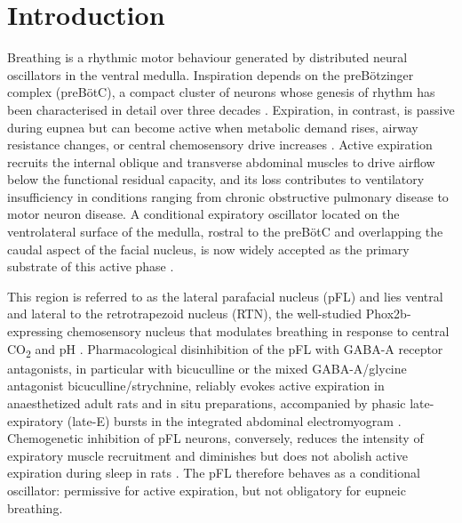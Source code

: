 
\section{Introduction}

Breathing is a rhythmic motor behaviour generated by distributed neural oscillators in the ventral medulla. Inspiration depends on the preB{\"o}tzinger complex (preB{\"o}tC), a compact cluster of neurons whose genesis of rhythm has been characterised in detail over three decades \citep{Smith1991PreBotzinger,Feldman2013Understanding,delNegro2018Breathing}. Expiration, in contrast, is passive during eupnea but can become active when metabolic demand rises, airway resistance changes, or central chemosensory drive increases \citep{Janczewski2006Distinct,Iscoe1998Control}. Active expiration recruits the internal oblique and transverse abdominal muscles to drive airflow below the functional residual capacity, and its loss contributes to ventilatory insufficiency in conditions ranging from chronic obstructive pulmonary disease to motor neuron disease. A conditional expiratory oscillator located on the ventrolateral surface of the medulla, rostral to the preB{\"o}tC and overlapping the caudal aspect of the facial nucleus, is now widely accepted as the primary substrate of this active phase \citep{Pagliardini2011Active,Pisanski2019Parafacial,delNegro2018Breathing}.

This region is referred to as the lateral parafacial nucleus (pFL) and lies ventral and lateral to the retrotrapezoid nucleus (RTN), the well-studied Phox2b-expressing chemosensory nucleus that modulates breathing in response to central CO\textsubscript{2} and pH \citep{Guyenet2010Central,GuyenetAbbott2013RTN,Takakura2013Phox2b,Marina2010Essential}. Pharmacological disinhibition of the pFL with GABA-A receptor antagonists, in particular with bicuculline or the mixed GABA-A/glycine antagonist bicuculline/strychnine, reliably evokes active expiration in anaesthetized adult rats and in situ preparations, accompanied by phasic late-expiratory (late-E) bursts in the integrated abdominal electromyogram \citep{Pagliardini2011Active,Abdala2009Abdominal,Molkov2010Computational,deBritto2017GABAergic}. Chemogenetic inhibition of pFL neurons, conversely, reduces the intensity of expiratory muscle recruitment and diminishes but does not abolish active expiration during sleep in rats \citep{Huckstepp2015Role,Pisanski2020Parafacial}. The pFL therefore behaves as a conditional oscillator: permissive for active expiration, but not obligatory for eupneic breathing.

